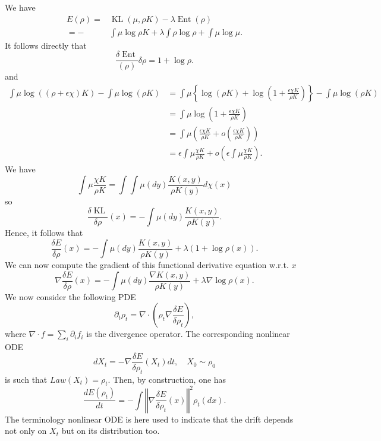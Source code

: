 \documentclass[a4paper]{article}
\DeclareMathOperator{\KL}{KL}
\DeclareMathOperator{\ent}{Ent}
\begin{document}
We have
\begin{align*}
E(\rho)= & \KL(\mu,\rho K)-\lambda\ent(\rho)\\
=- & \int\mu\log\rho K+\lambda\int\rho\log\rho+\int\mu\log\mu.
\end{align*}
It follows directly that 
\[
\frac{\delta\ent }{\left(\rho\right)}{\delta\rho}=1+\log\rho.
\]
and 
\begin{align*}
\int\mu\log\left(\left(\rho+\epsilon\chi\right)K\right)-\int\mu\log\left(\rho K\right) & =\int\mu\left\{ \log\left(\rho K\right)+\log\left(1+\frac{\epsilon\chi K}{\rho K}\right)\right\} -\int\mu\log\left(\rho K\right)\\
 & =\int\mu\log\left(1+\frac{\epsilon\chi K}{\rho K}\right)\\
 & =\int\mu\left(\frac{\epsilon\chi K}{\rho K}+o\left(\frac{\epsilon\chi K}{\rho K}\right)\right)\\
 & =\epsilon\int\mu\frac{\chi K}{\rho K}+o\left(\epsilon\int\mu\frac{\chi K}{\rho K}\right).
\end{align*}
We have 
\[
\int\mu\frac{\chi K}{\rho K}=\int\int\mu\left(dy\right)\frac{K(x,y)}{\rho K(y)}d\chi\left(x\right)
\]
so 
\[
\frac{\delta \KL}{\delta\rho}\left(x\right)=-\int\mu\left(dy\right)\frac{K(x,y)}{\rho K(y)}.
\]
Hence, it follows that 
\begin{equation}
\label{eq:derivative}
\frac{\delta E}{\delta\rho}\left(x\right)=-\int\mu\left(dy\right)\frac{K(x,y)}{\rho K(y)}+\lambda\left(1+\log\rho\left(x\right)\right).
\end{equation}
We can now compute the gradient of this functional derivative equation w.r.t. $x$
\[
\nabla\frac{\delta E}{\delta\rho}\left(x\right)=-\int\mu\left(dy\right)\frac{\nabla K(x,y)}{\rho K(y)}+\lambda\nabla\log\rho\left(x\right).
\]
We now consider the following PDE
\begin{equation}
\label{eq:pde}
\partial_{t}\rho_{t}=\nabla\cdot\left(\rho_{t}\nabla\frac{\delta E}{\delta\rho_{t}}\right),
\end{equation}
where $\nabla\cdot f=\sum_{i}\partial_{i}f_{i}$ is the divergence operator.
The corresponding nonlinear ODE 
\begin{equation}
dX_{t}=-\nabla\frac{\delta E}{\delta\rho_{t}}\left(X_{t}\right)dt,\quad X_{0}\sim\rho_{0}\label{eq:nonlinearODE}
\end{equation}
is such that $Law(X_{t})=\rho_{t}$.
Then, by construction, one has
\[
\frac{dE\left(\rho_{t}\right)}{dt}=-\int\left\Vert \nabla\frac{\delta E}{\delta\rho_{t}}\left(x\right)\right\Vert ^{2}\rho_{t}\left(dx\right).
\]
The terminology nonlinear ODE is here used to indicate that the drift depends not only on $X_{t}$ but on its distribution too.
\end{document}
